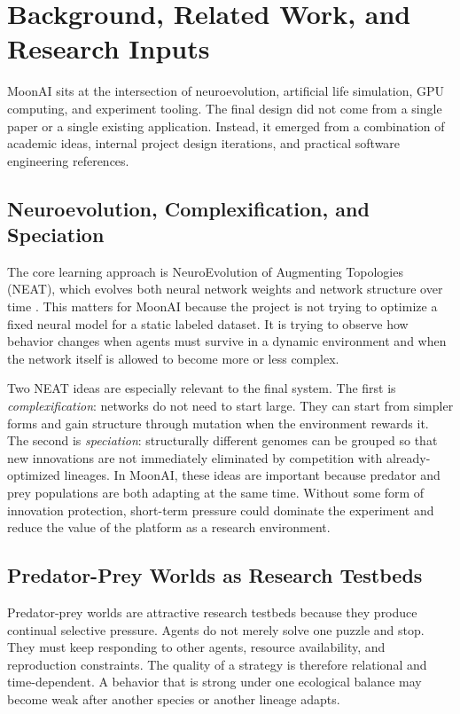 \section{Background, Related Work, and Research Inputs}
\label{sec:background}

MoonAI sits at the intersection of neuroevolution, artificial life simulation, GPU computing,
and experiment tooling. The final design did not come from a single paper or a single existing
application. Instead, it emerged from a combination of academic ideas, internal project design
iterations, and practical software engineering references.

\subsection{Neuroevolution, Complexification, and Speciation}

The core learning approach is NeuroEvolution of Augmenting Topologies (NEAT), which evolves
both neural network weights and network structure over time \cite{neat2002}. This matters for
MoonAI because the project is not trying to optimize a fixed neural model for a static labeled
dataset. It is trying to observe how behavior changes when agents must survive in a dynamic
environment and when the network itself is allowed to become more or less complex.

Two NEAT ideas are especially relevant to the final system. The first is
\emph{complexification}: networks do not need to start large. They can start from simpler forms
and gain structure through mutation when the environment rewards it. The second is
\emph{speciation}: structurally different genomes can be grouped so that new innovations are not
immediately eliminated by competition with already-optimized lineages. In MoonAI, these ideas
are important because predator and prey populations are both adapting at the same time. Without
some form of innovation protection, short-term pressure could dominate the experiment and reduce
the value of the platform as a research environment.

\subsection{Predator-Prey Worlds as Research Testbeds}

Predator-prey worlds are attractive research testbeds because they produce continual selective
pressure. Agents do not merely solve one puzzle and stop. They must keep responding to other
agents, resource availability, and reproduction constraints. The quality of a strategy is
therefore relational and time-dependent. A behavior that is strong under one ecological balance
may become weak after another species or another lineage adapts.


